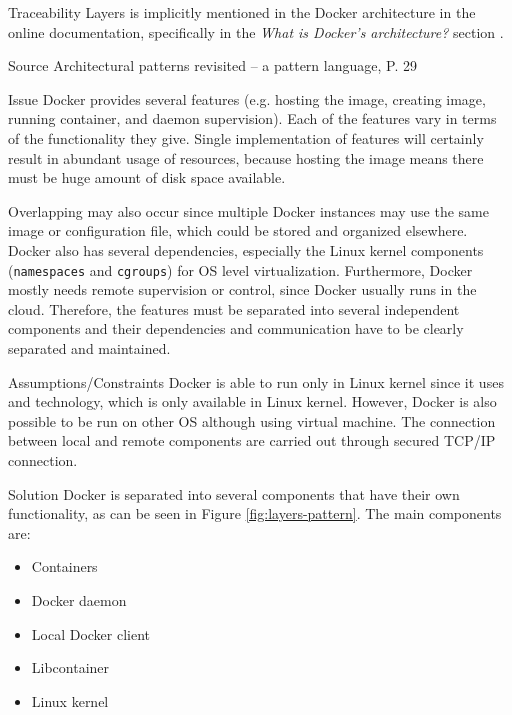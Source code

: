 \begin{patdescription}
\item [Traceability]
Layers is implicitly mentioned in the Docker architecture in the online
documentation, specifically in the \textit{What is Docker’s architecture?}
section \cite{dockerarchi}.

\item [Source]
Architectural patterns revisited -- a pattern language, P. 29
\cite{avgeriou2005architectural}

\item [Issue]
Docker provides several features (e.g. hosting the image, creating image, running container, and daemon supervision). Each of the features vary in terms of the functionality they give. Single implementation of features will certainly result in abundant usage of resources, because hosting the image means there must be huge amount of disk space available.
%

Overlapping may also occur since multiple Docker instances may use the same image or configuration file, which could be stored and organized elsewhere. Docker also has several dependencies, especially the Linux kernel components (\texttt{namespaces} and \texttt{cgroups}) for OS level virtualization.
Furthermore, Docker mostly needs remote supervision or control, since Docker usually runs in the cloud. Therefore, the features must be separated into several independent components and their dependencies and communication have to be clearly separated and maintained.

\item [Assumptions/Constraints]
 Docker is able to run only in Linux kernel since it uses  and  technology, which is only available in Linux kernel. However, Docker is also possible to be run on other OS although using virtual machine. The connection between local and remote components are carried out through secured TCP/IP connection. 

\item [Solution]
Docker is separated into several components that have their own functionality, as can be seen in Figure \ref{fig:layers-pattern}. The main components are:
\begin{itemize}
    \item Containers
    \item Docker daemon
    \item Local Docker client
    \item Libcontainer
    \item Linux kernel
\end{itemize}


\end{patdescription}
